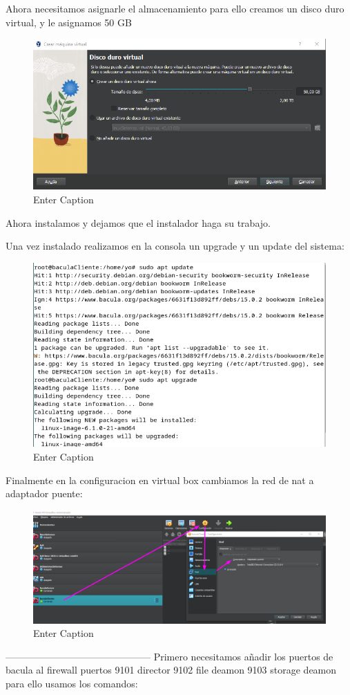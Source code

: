 Ahora necesitamos asignarle el almacenamiento para ello creamos un disco duro virtual, y le asignamos 50 GB
\begin{figure}[H]
    \centering
    \includegraphics[width=0.5\linewidth]{instalacionBacula/vbDisco.png}
    \caption{Enter Caption}
\end{figure}

Ahora instalamos y dejamos que el instalador haga su trabajo.

Una vez instalado realizamos en la consola un upgrade y un update del sistema:

\begin{figure}[H]
    \centering
    \includegraphics[width=0.5\linewidth]{instalacionBacula/Update y upgrade.png}
    \caption{Enter Caption}
\end{figure}

Finalmente en la configuracion en virtual box cambiamos la red de nat a adaptador puente:

\begin{figure}[H]
    \centering
    \includegraphics[width=0.5\linewidth]{instalacionBacula/NatAdaptadorPuente.png}
    \caption{Enter Caption}
\end{figure}



---------------------------------------------
Primero necesitamos añadir los puertos de bacula al firewall
puertos 9101 director 9102 file deamon 9103 storage deamon
para ello usamos los comandos:

